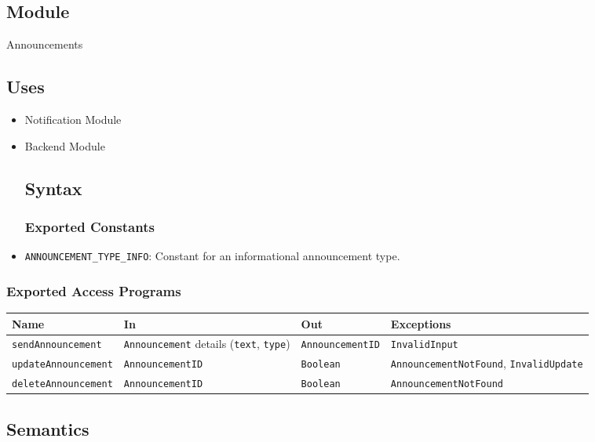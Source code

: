 \documentclass[12pt, titlepage]{article}
\begin{document}
\subsection{Module}
Announcements

\subsection{Uses}
\begin{itemize}
    \item Notification Module
    \item Backend Module
 
\subsection{Syntax}

\subsubsection{Exported Constants}
  \item \texttt{ANNOUNCEMENT\_TYPE\_INFO}: Constant for an informational announcement type.
\end{itemize}

\subsubsection{Exported Access Programs}
\begin{center}
  \begin{tabular}{p{4cm} p{4cm} p{3.5cm} p{4.5cm}}
    \toprule
    \textbf{Name} & \textbf{In} & \textbf{Out} & \textbf{Exceptions} \\
    \midrule
    \texttt{sendAnnouncement}     & \texttt{Announcement} details (\texttt{text}, \texttt{type}) & \texttt{AnnouncementID} & \texttt{InvalidInput} \\
    \texttt{updateAnnouncement}   & \texttt{AnnouncementID}                                      & \texttt{Boolean}         & \texttt{AnnouncementNotFound}, \texttt{InvalidUpdate} \\
    \texttt{deleteAnnouncement}   & \texttt{AnnouncementID}                                      & \texttt{Boolean}         & \texttt{AnnouncementNotFound} \\
    \bottomrule
  \end{tabular}
\end{center}

\subsection{Semantics}
\end{document}
